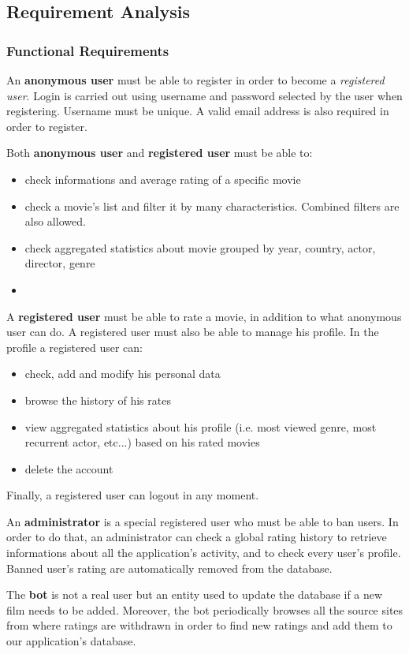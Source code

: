 \documentclass[10pt]{article}
\begin{document}
\subsection{Requirement Analysis}

\subsubsection{Functional Requirements}
An \textbf{anonymous user} must be able to register in order to become a 
\textit{registered user}. Login is carried out using username and password selected 
by the user when registering. Username must be unique. A valid email address is
also required in order to register.

Both \textbf{anonymous user} and \textbf{registered user} must be able to:
\begin{itemize}
	\item check informations and average rating of a specific movie
	\item check a movie's list and filter it by many characteristics. Combined filters 
	are also allowed.
	\item check aggregated statistics about movie grouped by year, country, actor,
	director, genre
	\item 
\end{itemize}

A \textbf{registered user} must be able to rate a movie, in addition to what anonymous
user can do. A registered user must also be able to manage his profile. In the profile a
registered user can:
\begin{itemize}
	\item check, add and modify his personal data
	\item browse the history of his rates
	\item view aggregated statistics about his profile (i.e. most viewed genre,
	most recurrent actor, etc...) based on his rated movies
	\item delete the account
\end{itemize}
Finally, a registered user can logout in any moment.

An \textbf{administrator} is a special registered user who must be able to ban users.
In order to do that, an administrator can check a global rating history to retrieve informations
about all the application's activity, and to check every user's profile.
Banned user's rating are automatically removed from the database.

The \textbf{bot} is not a real user but an entity used to update the database if a 
new film needs to be added. Moreover, the bot periodically browses all the source sites from 
where ratings are withdrawn in order to find new ratings and add them to our 
application's database.
\end{document}
